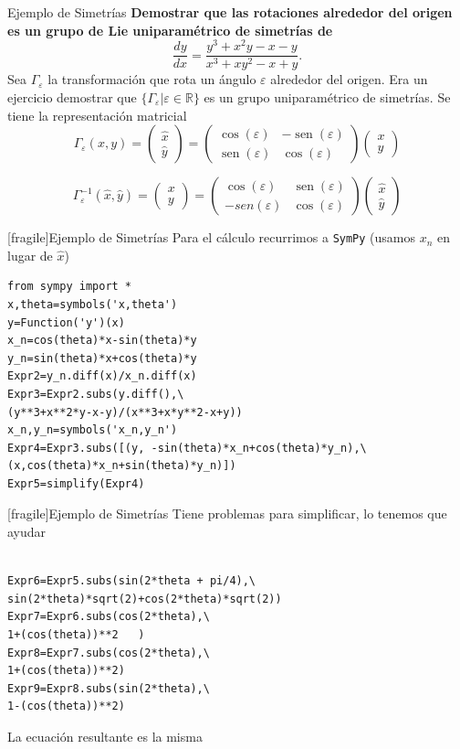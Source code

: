 \documentclass{article}
\newcommand{\rr}{\mathbb{R}}
\renewcommand{\emph}[1]{\textcolor[rgb]{1,0,0}{#1}}
\renewcommand{\epsilon}{\varepsilon}
\DeclareMathOperator{\sen}{sen}
\begin{document}
{Ejemplo de Simetrías}
\textbf{Demostrar que las rotaciones alrededor del origen es un grupo de Lie uniparamétrico de simetrías de}
 \[\frac{dy}{dx}=\frac{y^3+x^2y-x-y}{x^3+xy^2-x+y}.\]
Sea $\Gamma_{\epsilon}$ la transformación que rota un ángulo $\epsilon$ alrededor del origen. Era un ejercicio demostrar que  $\{\Gamma_{\epsilon}|\epsilon\in\rr\}$ es un grupo uniparamétrico de simetrías. Se tiene la representación matricial
\[
\Gamma_{\epsilon}(x,y)= \begin{pmatrix} \hat{x}\\ \hat{y}
\end{pmatrix}=\begin{pmatrix} \cos(\epsilon) & -\sen(\epsilon)
\\ \sen(\epsilon) & \cos(\epsilon)
\end{pmatrix} \begin{pmatrix} x\\ y
\end{pmatrix}
\]

\[
\Gamma^{-1}_{\epsilon}(\hat{x},\hat{y})= \begin{pmatrix} x\\ y
\end{pmatrix}=\begin{pmatrix} \cos(\epsilon) & \sen(\epsilon)
\\ -sen(\epsilon) & \cos(\epsilon)
\end{pmatrix} \begin{pmatrix} \hat{x}\\ \hat{y}
\end{pmatrix}
\]






[fragile]{Ejemplo de Simetrías}
 Para el cálculo recurrimos a \texttt{SymPy} (usamos $x_n$ en lugar de $\hat{x}$)
\begin{lstlisting}
from sympy import *
x,theta=symbols('x,theta')
y=Function('y')(x)
x_n=cos(theta)*x-sin(theta)*y
y_n=sin(theta)*x+cos(theta)*y
Expr2=y_n.diff(x)/x_n.diff(x)
Expr3=Expr2.subs(y.diff(),\
(y**3+x**2*y-x-y)/(x**3+x*y**2-x+y))
x_n,y_n=symbols('x_n,y_n')
Expr4=Expr3.subs([(y, -sin(theta)*x_n+cos(theta)*y_n),\
(x,cos(theta)*x_n+sin(theta)*y_n)])
Expr5=simplify(Expr4)
\end{lstlisting}


[fragile]{Ejemplo de Simetrías}
Tiene problemas para simplificar, lo tenemos que ayudar
\begin{lstlisting}

Expr6=Expr5.subs(sin(2*theta + pi/4),\
sin(2*theta)*sqrt(2)+cos(2*theta)*sqrt(2))
Expr7=Expr6.subs(cos(2*theta),\
1+(cos(theta))**2   )
Expr8=Expr7.subs(cos(2*theta),\
1+(cos(theta))**2)
Expr9=Expr8.subs(sin(2*theta),\
1-(cos(theta))**2)
\end{lstlisting}
La ecuación resultante es \emph{la misma}
\end{document}
